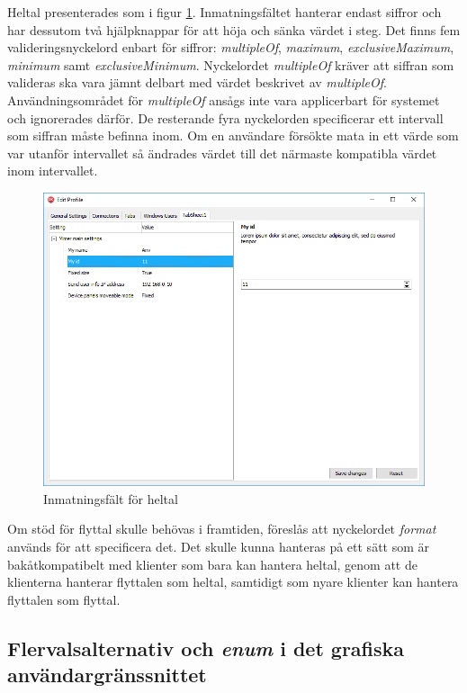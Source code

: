 Heltal presenterades som i figur \ref{fig:heltal}. Inmatningsfältet hanterar endast siffror och har dessutom två hjälpknappar för att höja och sänka värdet i steg. Det finns fem valideringsnyckelord enbart för siffror: \textit{multipleOf}, \textit{maximum}, \textit{exclusiveMaximum}, \textit{minimum} samt \textit{exclusiveMinimum}. Nyckelordet \textit{multipleOf} kräver att siffran som valideras ska vara jämnt delbart med värdet beskrivet av \textit{multipleOf}. Användningsområdet för \textit{multipleOf} ansågs inte vara applicerbart för systemet och ignorerades därför. De resterande fyra nyckelorden specificerar ett intervall som siffran måste befinna inom. Om en användare försökte mata in ett värde som var utanför intervallet så ändrades värdet till det närmaste kompatibla värdet inom intervallet. \cite[s.~9-10]{Andrews2018}

\begin{figure}
	\includegraphics[width=\textwidth]{./images/gui/heltal.png}
	\vspace{-1.7em}
	\caption{Inmatningsfält för heltal}
	\label{fig:heltal}
\end{figure}

Om stöd för flyttal skulle behövas i framtiden, föreslås att nyckelordet \textit{format} används för att specificera det. Det skulle kunna hanteras på ett sätt som är bakåtkompatibelt med klienter som bara kan hantera heltal, genom att de klienterna hanterar flyttalen som heltal, samtidigt som nyare klienter kan hantera flyttalen som flyttal.

\FloatBarrier
\subsection{Flervalsalternativ och \textit{enum} i det grafiska användargränssnittet}
\label{sec:arbetet:gui:enum}

